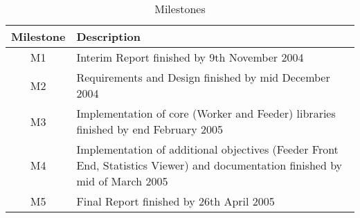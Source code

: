 \begin{table}[H]
\begin{tabularx}{\linewidth}{cX}
\toprule
\textbf{Milestone} & \textbf{Description} \\
\midrule
\endhead
M1 & Interim Report finished by 9th November 2004 \\
M2 & Requirements and Design finished by mid December 2004 \\
M3 & Implementation of core (Worker and Feeder) libraries finished by end February 2005 \\
M4 & Implementation of additional objectives (Feeder Front End, Statistics Viewer) and documentation finished by mid of March 2005 \\
M5 & Final Report finished by 26th April 2005 \\
\bottomrule
\end{tabularx}
\caption{Milestones}
\label{tab:milestones}
\end{table}
